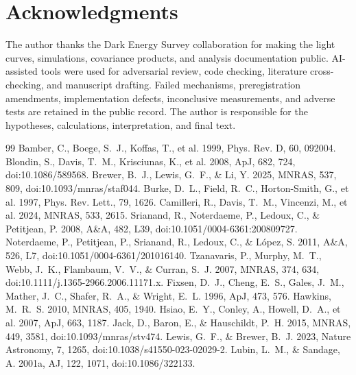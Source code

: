 \documentclass[11pt]{article}
\begin{document}
\section*{Acknowledgments}
The author thanks the Dark Energy Survey collaboration for making the light curves, simulations, covariance products, and analysis documentation public. AI-assisted tools were used for adversarial review, code checking, literature cross-checking, and manuscript drafting. Failed mechanisms, preregistration amendments, implementation defects, inconclusive measurements, and adverse tests are retained in the public record. The author is responsible for the hypotheses, calculations, interpretation, and final text.

\begin{thebibliography}{99}
 Bamber, C., Boege, S.~J., Koffas, T., et al. 1999, Phys. Rev. D, 60, 092004.
 Blondin, S., Davis, T.~M., Krisciunas, K., et al. 2008, ApJ, 682, 724, doi:10.1086/589568.
 Brewer, B.~J., Lewis, G.~F., \& Li, Y. 2025, MNRAS, 537, 809, doi:10.1093/mnras/staf044.
 Burke, D.~L., Field, R.~C., Horton-Smith, G., et al. 1997, Phys. Rev. Lett., 79, 1626.
 Camilleri, R., Davis, T.~M., Vincenzi, M., et al. 2024, MNRAS, 533, 2615.
 Srianand, R., Noterdaeme, P., Ledoux, C., \& Petitjean, P. 2008, A\&A, 482, L39, doi:10.1051/0004-6361:200809727.
 Noterdaeme, P., Petitjean, P., Srianand, R., Ledoux, C., \& L\'opez, S. 2011, A\&A, 526, L7, doi:10.1051/0004-6361/201016140.
 Tzanavaris, P., Murphy, M.~T., Webb, J.~K., Flambaum, V.~V., \& Curran, S.~J. 2007, MNRAS, 374, 634, doi:10.1111/j.1365-2966.2006.11171.x.
 Fixsen, D.~J., Cheng, E.~S., Gales, J.~M., Mather, J.~C., Shafer, R.~A., \& Wright, E.~L. 1996, ApJ, 473, 576.
 Hawkins, M.~R.~S. 2010, MNRAS, 405, 1940.
 Hsiao, E.~Y., Conley, A., Howell, D.~A., et al. 2007, ApJ, 663, 1187.
 Jack, D., Baron, E., \& Hauschildt, P.~H. 2015, MNRAS, 449, 3581, doi:10.1093/mnras/stv474.
 Lewis, G.~F., \& Brewer, B.~J. 2023, Nature Astronomy, 7, 1265, doi:10.1038/s41550-023-02029-2.
 Lubin, L.~M., \& Sandage, A. 2001a, AJ, 122, 1071, doi:10.1086/322133.

\end{thebibliography}
\end{document}

